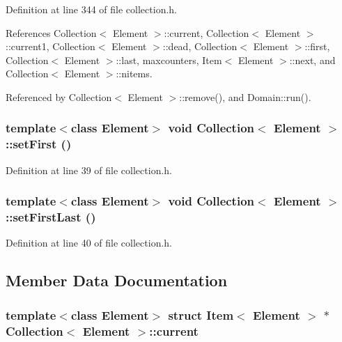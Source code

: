 Definition at line 344 of file collection.h.

References Collection$<$ Element $>$::current, Collection$<$ Element $>$::current1, Collection$<$ Element $>$::dead, Collection$<$ Element $>$::first, Collection$<$ Element $>$::last, maxcounters, Item$<$ Element $>$::next, and Collection$<$ Element $>$::nitems.

Referenced by Collection$<$ Element $>$::remove(), and Domain::run().\hypertarget{classCollection_024e58c57f4f773ddf327b730001cf0f}{
\subsubsection[{setFirst}]{\setlength{\rightskip}{0pt plus 5cm}template$<$class Element$>$ void {\bf Collection}$<$ Element $>$::setFirst ()}}
\label{classCollection_024e58c57f4f773ddf327b730001cf0f}




Definition at line 39 of file collection.h.\hypertarget{classCollection_12caadbe9b3b41f0ba74b23b6260143f}{
\subsubsection[{setFirstLast}]{\setlength{\rightskip}{0pt plus 5cm}template$<$class Element$>$ void {\bf Collection}$<$ Element $>$::setFirstLast ()}}
\label{classCollection_12caadbe9b3b41f0ba74b23b6260143f}




Definition at line 40 of file collection.h.

\subsection{Member Data Documentation}
\hypertarget{classCollection_9a563b3861767ca3dbed06dc587dd972}{
\subsubsection[{current}]{\setlength{\rightskip}{0pt plus 5cm}template$<$class Element$>$ struct {\bf Item}$<$ Element $>$ $\ast$ {\bf Collection}$<$ Element $>$::{\bf current}}}
\label{classCollection_9a563b3861767ca3dbed06dc587dd972}




